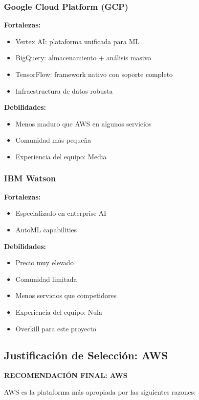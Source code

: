\documentclass[11pt,letterpaper]{article}
\begin{document}
\subsubsection{Google Cloud Platform (GCP)}

\textbf{Fortalezas:}
\begin{itemize}
  \item Vertex AI: plataforma unificada para ML
  \item BigQuery: almacenamiento + análisis masivo
  \item TensorFlow: framework nativo con soporte completo
  \item Infraestructura de datos robusta
\end{itemize}

\textbf{Debilidades:}
\begin{itemize}
  \item Menos maduro que AWS en algunos servicios
  \item Comunidad más pequeña
  \item Experiencia del equipo: Media
\end{itemize}

\subsubsection{IBM Watson}

\textbf{Fortalezas:}
\begin{itemize}
  \item Especializado en enterprise AI
  \item AutoML capabilities
\end{itemize}

\textbf{Debilidades:}
\begin{itemize}
  \item Precio muy elevado
  \item Comunidad limitada
  \item Menos servicios que competidores
  \item Experiencia del equipo: Nula
  \item Overkill para este proyecto
\end{itemize}

\subsection{Justificación de Selección: AWS}

\textbf{RECOMENDACIÓN FINAL: AWS}

AWS es la plataforma más apropiada por las siguientes razones:
\end{document}
